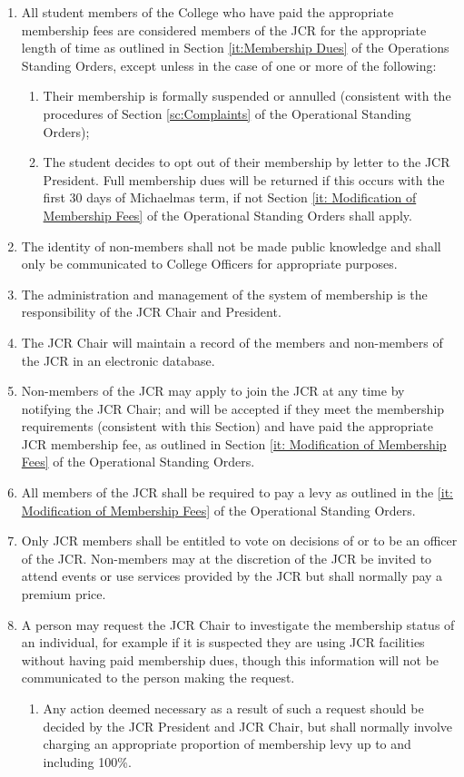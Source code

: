 \begin{enumerate}
    \item All student members of the College who have paid the appropriate membership fees are considered members of the JCR for the appropriate length of time as outlined in Section \ref{it:Membership Dues} of the Operations Standing Orders, except unless in the case of one or more of the following:
    \begin{enumerate}
        \item Their membership is formally suspended or annulled (consistent with the procedures of Section \ref{sc:Complaints} of the Operational Standing Orders);
        \item The student decides to opt out of their membership by letter to the JCR President. Full membership dues will be returned if this occurs with the first 30 days of Michaelmas term, if not Section \ref{it: Modification of Membership Fees} of the Operational Standing Orders shall apply.
    \end{enumerate}
    \item The identity of non-members shall not be made public knowledge and shall only be communicated to College Officers for appropriate purposes.
    \item  The administration and management of the system of membership is the responsibility of the JCR Chair and President.
    \item The JCR Chair will maintain a record of the members and non-members of the JCR in an electronic database.
    \item Non-members of the JCR may apply to join the JCR at any time by notifying the JCR Chair; and will be accepted if they meet the membership requirements (consistent with this Section) and have paid the appropriate JCR membership fee, as outlined in Section \ref{it: Modification of Membership Fees} of the Operational Standing Orders.
    \item All members of the JCR shall be required to pay a levy as outlined in the \ref{it: Modification of Membership Fees} of the Operational Standing Orders. 
    \item Only JCR members shall be entitled to vote on decisions of or to be an officer of the JCR. Non-members may at the discretion of the JCR be invited to attend events or use services provided by the JCR but shall normally pay a premium price.
    \item A person may request the JCR Chair to investigate the membership status of an individual, for example if it is suspected they are using JCR facilities without having paid membership dues, though this information will not be communicated to the person making the request.
    \begin{enumerate}
        \item Any action deemed necessary as a result of such a request should be decided by the JCR President and JCR Chair, but shall normally involve charging an appropriate proportion of membership levy up to and including 100\%.
    \end{enumerate}
\end{enumerate}

